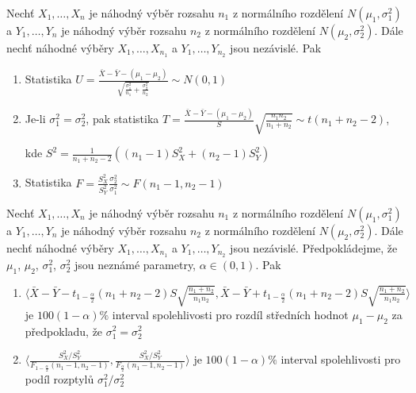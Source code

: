 \begin{theorem}
Nechť $X_1,\ldots,X_n$ je náhodný výběr rozsahu $n_1$ z normálního rozdělení $N\left(\mu_1,\sigma_{1}^{2} \right)$ a $Y_1,\ldots,Y_n$ je náhodný výběr rozsahu $n_2$ z normálního rozdělení $N\left(\mu_2,\sigma_{2}^{2} \right)$. Dále nechť náhodné výběry $X_1,\ldots,X_{n_1}$ a $Y_1,\ldots,Y_{n_2}$ jsou nezávislé. Pak \begin{enumerate}
\item Statistika $U = \frac{\bar{X}-\bar{Y}-\left(\mu_1 - \mu_2 \right)}{\sqrt{ \frac{\sigma_{1}^{2}}{n_1} +  \frac{\sigma_{2}^{2}}{n_2} }} \sim N\left(0,1 \right)$
\item Je-li $\sigma_{1}^{2} = \sigma_{2}^{2}$, pak statistika $T = \frac{\bar{X}-\bar{Y}-\left(\mu_1 - \mu_2 \right)}{S}\sqrt{\frac{n_1 n_2}{n_1 + n_2}} \sim t \left(n_1 + n_2 -2 \right)$,

kde $S^2 = \frac{1}{n_1 +n_2 -2} \left( \left( n_1 - 1 \right) S_{X}^{2} + \left( n_2 - 1 \right) S_{Y}^{2} \right)$
\item Statistika $F = \frac{S_{X}^{2}}{ S_{Y}^{2}} \frac{\sigma_{2}^{2}}{\sigma_{1}^{2}} \sim F\left(n_1 - 1, n_2 -1 \right)$
\end{enumerate}
\end{theorem}

\begin{dusledek}
Nechť $X_1,\ldots,X_n$ je náhodný výběr rozsahu $n_1$ z normálního rozdělení $N\left(\mu_1,\sigma_{1}^{2} \right)$ a $Y_1,\ldots,Y_n$ je náhodný výběr rozsahu $n_2$ z normálního rozdělení $N\left(\mu_2,\sigma_{2}^{2} \right)$. Dále nechť náhodné výběry $X_1,\ldots,X_{n_1}$ a $Y_1,\ldots,Y_{n_2}$ jsou nezávislé. Předpokládejme, že $\mu_1$, $\mu_2$, $\sigma_{1}^{2}$, $\sigma_{2}^{2}$ jsou neznámé parametry, $\alpha \in \left(0,1\right)$. Pak \begin{enumerate}
\item $\langle \bar{X} - \bar{Y} -  t_{1-\frac{\alpha}{2}} \left(n_1 + n_2 -2 \right) S \sqrt{\frac{n_1 + n_2}{n_1 n_2}}, \bar{X} - \bar{Y} +  t_{1-\frac{\alpha}{2}} \left(n_1 + n_2 -2 \right) S \sqrt{\frac{n_1 + n_2}{n_1 n_2}} \rangle$ je $100\left(1-\alpha \right)\%$ interval spolehlivosti pro rozdíl středních hodnot $\mu_1 - \mu_2$ za předpokladu, že $\sigma_{1}^{2} = \sigma_{2}^{2}$
\item $\langle \frac{ S_{X}^{2}/ S_{Y}^{2}}{F_{1-\frac{\alpha}{2}} \left(n_1 -1, n_2 -1 \right)}, \frac{ S_{X}^{2}/ S_{Y}^{2}}{F_{\frac{\alpha}{2}} \left(n_1 -1, n_2 -1 \right)}   \rangle$ je $100\left(1-\alpha \right)\%$ interval spolehlivosti pro podíl rozptylů $\sigma_{1}^{2} / \sigma_{2}^{2}$
\end{enumerate} 
\end{dusledek}

